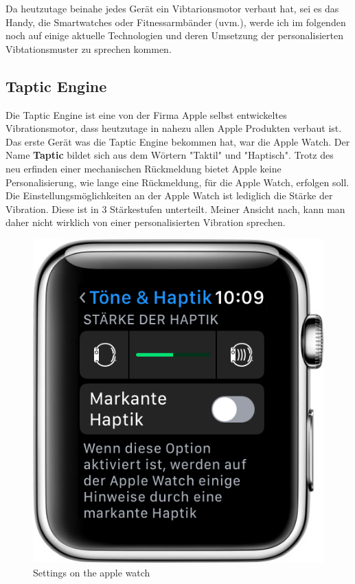 
Da heutzutage beinahe jedes Ger{\"a}t ein Vibtarionsmotor verbaut hat, sei es das Handy, die Smartwatches oder Fitnessarmb{\"a}nder (uvm.), werde ich im folgenden noch auf einige aktuelle Technologien und deren Umsetzung der personalisierten Vibtationsmuster zu sprechen kommen. 

\subsection{Taptic Engine}
\label{ch:Grundlagen:sec:RelatedWork:subsec:TapticEngine}

Die Taptic Engine ist eine von der Firma Apple selbst entwickeltes Vibrationsmotor, dass heutzutage in nahezu allen Apple Produkten verbaut ist. Das erste Ger{\"a}t was die Taptic Engine bekommen hat, war die Apple Watch. Der Name \textbf{Taptic} bildet sich aus dem W{\"o}rtern "Taktil" und "Haptisch". 
Trotz des neu erfinden einer mechanischen R{\"u}ckmeldung bietet Apple keine Personalisierung, wie lange eine R{\"u}ckmeldung, f{\"u}r die Apple Watch, erfolgen soll. Die Einstellungsm{\"o}glichkeiten an der Apple Watch ist lediglich die St{\"a}rke der Vibration. Diese ist in 3 St{\"a}rkestufen unterteilt. Meiner Ansicht nach, kann man daher nicht wirklich von einer personalisierten Vibration sprechen. 

\begin{figure}
	\centering
    \includegraphics[width=\textwidth]{pics/applewatch.png}
    \caption{Settings on the apple watch}
    \label{fig:applewatch}
\end{figure}
 

